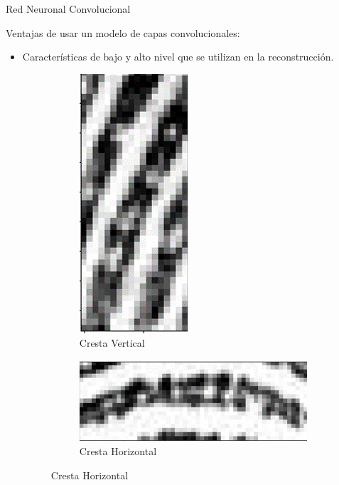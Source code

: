 \documentclass[12pt]{beamer}
\begin{document}
\begin{frame}{Red Neuronal Convolucional}

    Ventajas de usar un modelo de capas convolucionales:
    \vspace{5mm}
    
    \begin{itemize}
        \item Características de bajo y alto nivel que se utilizan en la reconstrucción.
        \vspace{4mm}
        
        \begin{figure}[h]
            \begin{subfigure}{0.18\textwidth}
                \centering
                \includegraphics[scale=0.16]{figs/fll_0.png}  
                \caption{Cresta Vertical}
            \end{subfigure}
            \begin{subfigure}{0.18\textwidth}
                \centering
                \includegraphics[scale=0.16]{figs/fll_1.png}  
                \caption{Cresta Horizontal}
            \end{subfigure}

\end{figure}
\end{itemize}
\end{frame}
\end{document}
